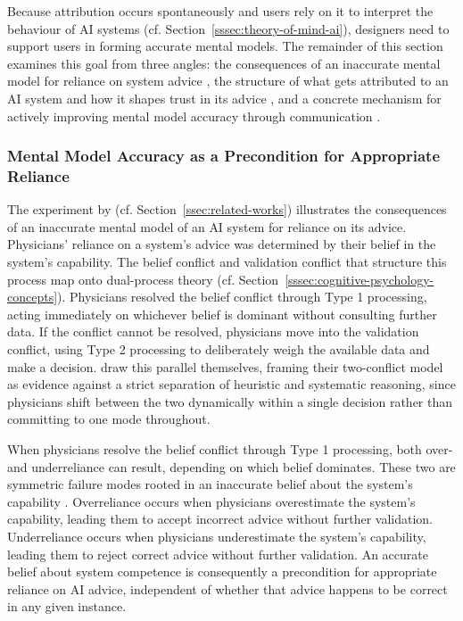 Because attribution occurs spontaneously and users rely on it to interpret the behaviour of \ac{AI} systems (cf. Section~\ref{sssec:theory-of-mind-ai}), designers need to support users in forming accurate mental models. The remainder of this section examines this goal from three angles: the consequences of an inaccurate mental model for reliance on system advice \parencite{Jussupow2021}, the structure of what gets attributed to an \ac{AI} system and how it shapes trust in its advice \parencite{Colombatto2025}, and a concrete mechanism for actively improving mental model accuracy through communication \parencite{Ying2024}.

\subsubsection*{Mental Model Accuracy as a Precondition for Appropriate Reliance}

The experiment by \textcite{Jussupow2021} (cf. Section~\ref{ssec:related-works}) illustrates the consequences of an inaccurate mental model of an \ac{AI} system for reliance on its advice. Physicians' reliance on a system's advice was determined by their belief in the system's capability. The belief conflict and validation conflict that structure this process map onto dual-process theory (cf. Section~\ref{sssec:cognitive-psychology-concepts}). Physicians resolved the belief conflict through Type 1 processing, acting immediately on whichever belief is dominant without consulting further data. If the conflict cannot be resolved, physicians move into the validation conflict, using Type 2 processing to deliberately weigh the available data and make a decision. \textcite{Jussupow2021} draw this parallel themselves, framing their two-conflict model as evidence against a strict separation of heuristic and systematic reasoning, since physicians shift between the two dynamically within a single decision rather than committing to one mode throughout.

When physicians resolve the belief conflict through Type 1 processing, both over- and underreliance can result, depending on which belief dominates. These two are symmetric failure modes rooted in an inaccurate belief about the system's capability \parencite{Jussupow2021}. Overreliance occurs when physicians overestimate the system's capability, leading them to accept incorrect advice without further validation. Underreliance occurs when physicians underestimate the system's capability, leading them to reject correct advice without further validation. An accurate belief about system competence is consequently a precondition for appropriate reliance on \ac{AI} advice, independent of whether that advice happens to be correct in any given instance.

